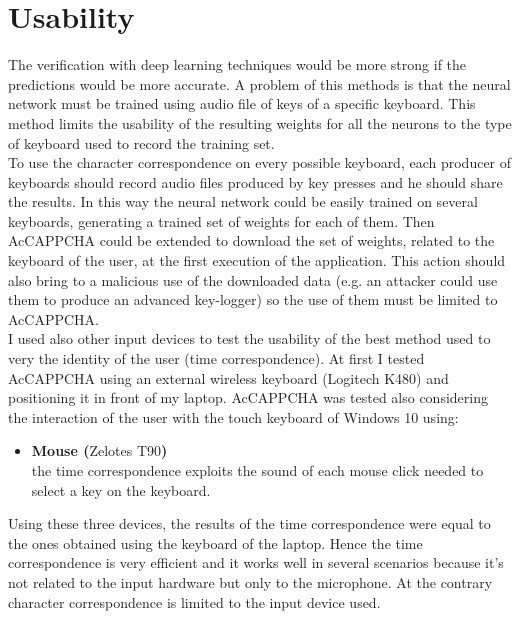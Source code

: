\section{Usability}
The verification with deep learning techniques would be more strong if the predictions would be more accurate. A problem of this methods is that the neural network must be trained using audio file of keys of a specific keyboard. This method limits the usability of the resulting weights for all the neurons to the type of keyboard used to record the training set.\\
To use the character correspondence on every possible keyboard, each producer of keyboards should record audio files produced by key presses and he should share the results. In this way the neural network could be easily trained on several keyboards, generating a trained set of weights for each of them. Then AcCAPPCHA could be extended to download the set of weights, related to the keyboard of the user, at the first execution of the application. This action should also bring to a malicious use of the downloaded data (e.g. an attacker could use them to produce an advanced key-logger) so the use of them must be limited to AcCAPPCHA.\\
I used also other input devices to test the usability of the best method used to very the identity of the user (time correspondence). At first I tested AcCAPPCHA using an external wireless keyboard (Logitech K480) and positioning it in front of my laptop. AcCAPPCHA was tested also considering the interaction of the user with the touch keyboard of Windows 10 using:
\begin{itemize}
\item{\textbf{Mouse (}Zelotes T90\textbf{)}\\
the time correspondence exploits the sound of each mouse click needed to select a key on the keyboard.}
\end{itemize}
Using these three devices, the results of the time correspondence were equal to the ones obtained using the keyboard of the laptop. Hence the time correspondence is very efficient and it works well in several scenarios because it's not related to the input hardware but only to the microphone. At the contrary character correspondence is limited to the input device used. 